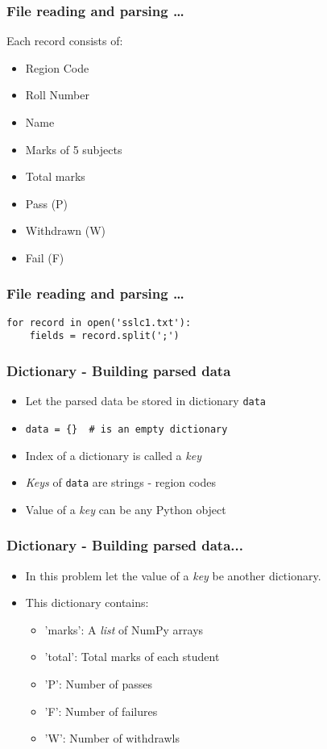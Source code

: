 \documentclass[14pt,compress]{beamer}
\newcommand{\typ}[1]{\lstinline{#1}}
\begin{document}
\begin{frame}
  \frametitle{File reading and parsing \ldots}
  Each record consists of:
  \begin{itemize}
    \item Region Code
    \item Roll Number
    \item Name
    \item Marks of 5 subjects
    \item Total marks
    \item Pass (P)
    \item Withdrawn (W)
    \item Fail (F)
  \end{itemize}
\end{frame}

\begin{frame}[fragile]
  \frametitle{File reading and parsing \ldots}
  \begin{lstlisting}
for record in open('sslc1.txt'):
    fields = record.split(';')
  \end{lstlisting}
\end{frame}

\begin{frame}[fragile]
  \frametitle{Dictionary - Building parsed data}
  \begin{itemize}
    \item Let the parsed data be stored in dictionary \typ{data}
    \item \begin{lstlisting}
data = {}  # is an empty dictionary
\end{lstlisting}
    \item Index of a dictionary is called a \emph{key}
    \item \emph{Keys} of \typ{data} are strings - region codes
    \item Value of a \emph{key} can be any Python object
  \end{itemize}
\end{frame}

\begin{frame}[fragile]
  \frametitle{Dictionary - Building parsed data...}
  \begin{itemize}
    \item In this problem let the value of a \emph{key} be another dictionary.
    \item This dictionary contains:
    \begin{itemize}
      \item 'marks': A \emph{list} of NumPy arrays
      \item 'total': Total marks of each student
      \item 'P': Number of passes
      \item 'F': Number of failures
      \item 'W': Number of withdrawls
    \end{itemize}
  \end{itemize}
\end{frame}
\end{document}

